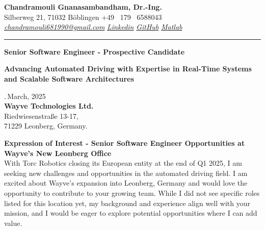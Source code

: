 \documentclass[a4paper,10pt]{article}
\newcommand{\link}[1]{{\textit{#1}}}
\begin{document}
\thispagestyle{plain}

\begin{center}
    {\Large \textbf{Chandramouli Gnanasambandham, Dr.-Ing.}}\\ 
    
    \vspace{0.2cm}
    \small Silberweg 21, 71032 B\"oblingen \hfill  \bullet  \hfill  +49 \ 179 \ 6588043 \hfill \bullet  \hfill
    \textup{\href{mailto:chandramouli681990@gmail.com}{\link{chandramouli681990@gmail.com}}} \hfill \bullet \hfill
    \textup{\href{https://www.linkedin.com/in/ganasambandhamc/}{\link{Linkedin}}} \hfill \bullet \hfill
    \textup{\href{https://github.com/chandramouli6890}{\link{GitHub}}} \hfill \bullet \hfill
    \textup{\href{https://de.mathworks.com/matlabcentral/profile/authors/4267772}{\link{Matlab}}}

    \vspace{-0.2cm}
    {\rule{\linewidth}{0.8pt}}

    \vspace{0.2cm}
    {\Large \textbf{Senior Software Engineer - Prospective Candidate}}
    
    \vspace{0.1cm}
    \colorbox{gray!40}{%
        \parbox{0.99\textwidth}{%
            \centering \textcolor{highlightcolor}{\textbf{Advancing Automated Driving with Expertise in Real-Time Systems and Scalable Software Architectures}}
        }%
    }
\end{center}

\vspace{0.5cm}
.\,March, 2025\\

{\noindent
\textbf{Wayve Technologies Ltd.}\\
Riedwiesenstraße 13-17,\\
71229 Leonberg, Germany.\\
}

\noindent \textbf{Expression of Interest - Senior Software Engineer Opportunities at Wayve's New Leonberg Office} \\

\noindent With Torc Robotics closing its European entity at the end of Q1 2025,
I am seeking new challenges and opportunities in the automated driving field. I
am excited about Wayve’s expansion into Leonberg, Germany and would love the
opportunity to contribute to your growing team. While I did not see specific
roles listed for this location yet, my background and experience align well
with your mission, and I would be eager to explore potential opportunities
where I can add value.\\
\end{document}
